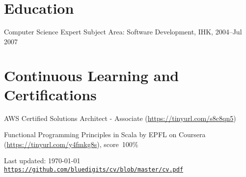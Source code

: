 \documentclass[letterpaper]{article}
\def\footerlink{https://github.com/bluedigits/cv/blob/master/cv.pdf}
\newenvironment{no-indent-itemize}{
  \begin{list}{}{
    \setlength{\leftmargin}{0em}
  }
}{
  \end{list}
}
\begin{document}
\section*{Education}
\begin{no-indent-itemize}
  \item Computer Science Expert Subject Area: Software Development, IHK, 2004--Jul 2007
\end{no-indent-itemize}

\section*{Continuous Learning and Certifications}
\begin{no-indent-itemize}
  \item AWS Certified Solutions Architect - Associate
  		(\href{https://tinyurl.com/s8c8qn5}{https://tinyurl.com/s8c8qn5})
  \item Functional Programming Principles in Scala by EPFL on Coursera 
        (\href{https://tinyurl.com/y4fmkg8s}{https://tinyurl.com/y4fmkg8s}), score~100\%
\end{no-indent-itemize}

\bigskip
\begin{center}
  \begin{footnotesize}
    Last updated: \today \\
    \href{\footerlink}{\texttt{\footerlink}}
  \end{footnotesize}
\end{center}
\end{document}
